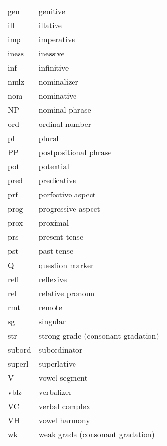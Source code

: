 \begin{longtable}{ll}
{gen}	& genitive \\
{ill}	& illative \\
{imp}	& imperative \\
{iness}	& inessive \\
{inf}	& infinitive \\
{nmlz}	& nominalizer \\
{nom}	& nominative \\
NP&nominal phrase\\
{ord}	& ordinal number \\
{pl}	& plural \\
PP&postpositional phrase\\
{pot}	& potential \\
{pred} & predicative\\
{prf}	& perfective aspect \\
{prog}	& progressive aspect \\
{prox}	& proximal \\
{prs}	& present tense \\
{pst}	& past tense \\
{Q}	& question marker \\
{refl}	& reflexive\\
{rel}	& relative pronoun \\
{rmt}	& remote \\
{sg}	& singular \\
str		&strong grade (consonant gradation) \\
{subord}& subordinator \\
{superl}& superlative \\
V		&vowel segment\\
{vblz}	& verbalizer \\
VC		&verbal complex\\
VH		&vowel harmony\\
wk		&weak grade (consonant gradation) \\
\end{longtable}


